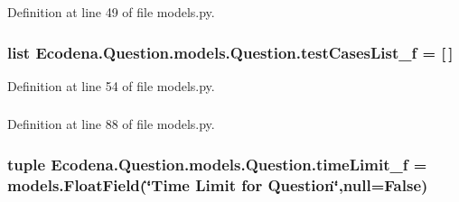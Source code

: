 Definition at line 49 of file models.py.

\hypertarget{class_ecodena_1_1_question_1_1models_1_1_question_aab630f0c2e6a45bd234c67481afc1448}{
\subsubsection[{testCasesList\_\-f}]{\setlength{\rightskip}{0pt plus 5cm}list {\bf Ecodena.Question.models.Question.testCasesList\_\-f} = \mbox{[}$\,$\mbox{]}}}
\label{d1/d67/class_ecodena_1_1_question_1_1models_1_1_question_aab630f0c2e6a45bd234c67481afc1448}


Definition at line 54 of file models.py.

\hypertarget{class_ecodena_1_1_question_1_1models_1_1_question_af2ca53119fdb8e495aa8d427287dcdb2}{
\subsubsection[{testCasesList\_\-f}]{}}
\label{d1/d67/class_ecodena_1_1_question_1_1models_1_1_question_af2ca53119fdb8e495aa8d427287dcdb2}


Definition at line 88 of file models.py.

\hypertarget{class_ecodena_1_1_question_1_1models_1_1_question_a4143fa9996843ba6c2febcab8e8ceae8}{
\subsubsection[{timeLimit\_\-f}]{\setlength{\rightskip}{0pt plus 5cm}tuple {\bf Ecodena.Question.models.Question.timeLimit\_\-f} = models.FloatField(\char`\"{}Time Limit for {\bf Question}\char`\"{},null=False)}}
\label{d1/d67/class_ecodena_1_1_question_1_1models_1_1_question_a4143fa9996843ba6c2febcab8e8ceae8}



